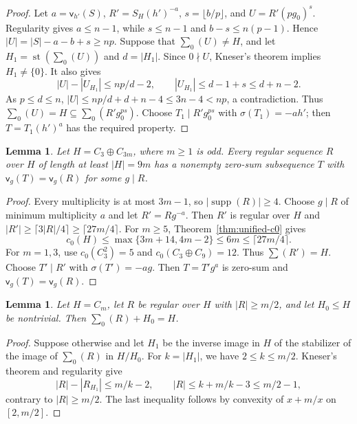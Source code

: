 \documentclass[10pt,reqno]{amsart}
\newtheorem{lem}[thm]{Lemma}
\theoremstyle{definition}
\theoremstyle{remark}
\numberwithin{equation}{section}
\DeclareMathOperator{\supp}{supp}
\DeclareMathOperator{\st}{st}
\begin{document}
\begin{proof}
Let $a=\mathsf v_{h'}(S)$, $R'=S_H(h')^{-a}$,
$s=\lfloor b/p\rfloor$, and $U=R'(pg_0)^s$.
Regularity gives $a\le n-1$, while $s\le n-1$ and
$b-s\le n(p-1)$. Hence $|U|=|S|-a-b+s\ge np$.
Suppose that $\sum_0(U)\ne H$, and let
$H_1=\st(\sum_0(U))$ and $d=|H_1|$.
Since $0\nmid U$, Kneser's theorem implies $H_1\ne\{0\}$.
It also gives
\[
|U|-|U_{H_1}|\le np/d-2,\qquad
|U_{H_1}|\le d-1+s\le d+n-2.
\]
As $p\le d\le n$,
$|U|\le np/d+d+n-4\le3n-4<np$, a contradiction.
Thus $\sum_0(U)=H\subseteq\sum_0(R'g_0^{ps})$.
Choose $T_1\mid R'g_0^{ps}$ with $\sigma(T_1)=-ah'$;
then $T=T_1(h')^a$ has the required property.
\end{proof}

\begin{lem}\label{lem:N-noncyclic-subgroup-three}
Let $H=C_3\oplus C_{3m}$, where $m\ge1$ is odd.
Every regular sequence $R$ over $H$ of length at least $|H|=9m$
has a nonempty zero-sum subsequence $T$ with
$\mathsf v_g(T)=\mathsf v_g(R)$ for some $g\mid R$.
\end{lem}

\begin{proof}
Every multiplicity is at most $3m-1$, so $|\supp(R)|\ge4$.
Choose $g\mid R$ of minimum multiplicity $a$ and let $R'=Rg^{-a}$.
Then $R'$ is regular over $H$ and
$|R'|\ge\lceil3|R|/4\rceil\ge\lceil27m/4\rceil$.
For $m\ge5$, Theorem~\ref{thm:unified-c0} gives
\[
c_0(H)\le\max\{3m+14,4m-2\}\le6m\le\lceil27m/4\rceil.
\]
For $m=1,3$, use $c_0(C_3^2)=5$ and $c_0(C_3\oplus C_9)=12$.
Thus $\sum(R')=H$. Choose $T'\mid R'$ with $\sigma(T')=-ag$.
Then $T=T'g^a$ is zero-sum and $\mathsf v_g(T)=\mathsf v_g(R)$.
\end{proof}

\begin{lem}\label{lem:N-half-quotient}
Let $H=C_m$, let $R$ be regular over $H$ with $|R|\ge m/2$,
and let $H_0\le H$ be nontrivial. Then $\sum_0(R)+H_0=H$.
\end{lem}
\begin{proof}
Suppose otherwise and let $H_1$ be the inverse image in $H$ of the
stabilizer of the image of $\sum_0(R)$ in $H/H_0$.
For $k=|H_1|$, we have $2\le k\le m/2$.
Kneser's theorem and regularity give
\[
 |R|-|R_{H_1}|\le m/k-2,\qquad
 |R|\le k+m/k-3\le m/2-1,
\]
contrary to $|R|\ge m/2$. The last inequality follows by convexity
of $x+m/x$ on $[2,m/2]$.
\end{proof}
\end{document}
